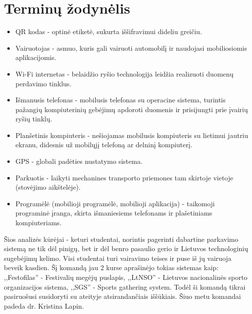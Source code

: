 \documentclass{VUMIFPSkursinis}
\begin{document}
\section{Terminų žodynėlis}
\begin{itemize}
	\item QR kodas - optinė etiketė, sukurta iššifravimui dideliu greičiu.
	\item Vairuotojas - asmuo, kuris gali vairuoti automobilį ir naudojasi mobiliosiomis aplikacijomis.
	\item Wi-Fi internetas - belaidžio ryšio technologija leidžia realizuoti duomenų perdavimo tinklus.
	\item Išmanusis telefonas - mobilusis telefonas su operacine sistema, turintis pažangių kompiuterinių gebėjimų apdoroti duomenis ir prisijungti prie įvairių ryšių tinklų.
	\item Planšetinis kompiuteris - nešiojamas mobilusis kompiuteris su lietimui jautriu ekranu, didesnis už mobilųjį telefoną ar delninį kompiuterį.
	\item GPS - globali padėties nustatymo sistema.
	\item Parkuotis - laikyti mechanines transporto priemones tam skirtoje vietoje (stovėjimo aikštelėje).
	\item Programėlė (mobilioji programėlė, mobilioji aplikacija) - taikomoji programinė įranga, skirta išmaniesiems telefonams ir plašetiniams kompiuteriams.
\end{itemize}


	Šios analizės kūrėjai - keturi studentai, norintis pagerinti dabartine parkavimo sistemą ne tik dėl pinigų, bet ir dėl benro pasaulio gerio ir Lietuvos technologinių sugebėjimų kelimo. Visi studentai turi vairavimo teises ir puse iš jų vairuoja beveik kasdien. Šį komandą jau 2 kurse aprašinėjo tokias sistemas kaip: ,,Festofilas'' - Festivalių megėjų puslapis, ,,LtNSO'' - Lietuvos nacionalinės sporto organizacijos sistema, ,,SGS'' - Sports gathering system. Todėl ši komandą tikrai pasiruošusi susidoryti su ateityje atsirandančiais iššūkiais. Šiuo metu komandai padeda dr. Kristina Lapin.
\end{document}
